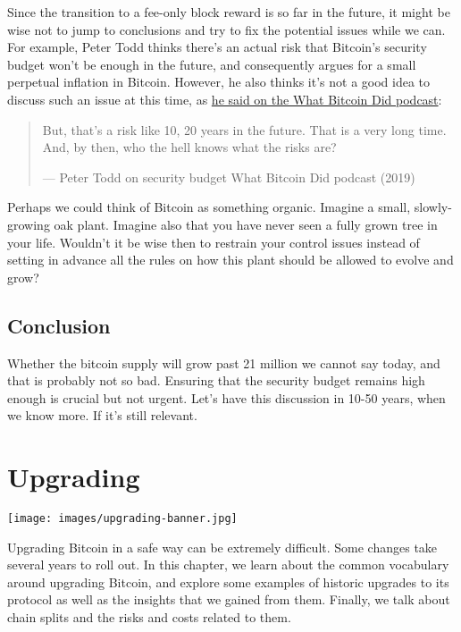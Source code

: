 Since the transition to a fee-only block reward is so far in the future,
it might be wise not to jump to conclusions and try to fix the potential
issues while we can. For example, Peter Todd thinks there's an actual
risk that Bitcoin's security budget won't be enough in the future, and
consequently argues for a small perpetual inflation in Bitcoin. However,
he also thinks it's not a good idea to discuss such an issue at this
time, as
\href{https://www.whatbitcoindid.com/podcast/peter-todd-on-the-essence-of-bitcoin}{he
said on the What Bitcoin Did podcast}:

\begin{quote}
But, that's a risk like 10, 20 years in the future. That is a very long
time. And, by then, who the hell knows what the risks are?

---  Peter Todd on security budget What Bitcoin Did podcast (2019)
\end{quote}

Perhaps we could think of Bitcoin as something organic. Imagine a small,
slowly-growing oak plant. Imagine also that you have never seen a fully
grown tree in your life. Wouldn't it be wise then to restrain your
control issues instead of setting in advance all the rules on how this
plant should be allowed to evolve and grow?

\hypertarget{_conclusion_2}{%
\subsection{Conclusion}\label{_conclusion_2}}

Whether the bitcoin supply will grow past 21 million we cannot say
today, and that is probably not so bad. Ensuring that the security
budget remains high enough is crucial but not urgent. Let's have this
discussion in 10-50 years, when we know more. If it's still relevant.

\hypertarget{upgrading}{%
\section{Upgrading}\label{upgrading}}

\texttt{[image: images/upgrading-banner.jpg]}

Upgrading Bitcoin in a safe way can be extremely difficult. Some changes
take several years to roll out. In this chapter, we learn about the
common vocabulary around upgrading Bitcoin, and explore some examples of
historic upgrades to its protocol as well as the insights that we gained
from them. Finally, we talk about chain splits and the risks and costs
related to them.

